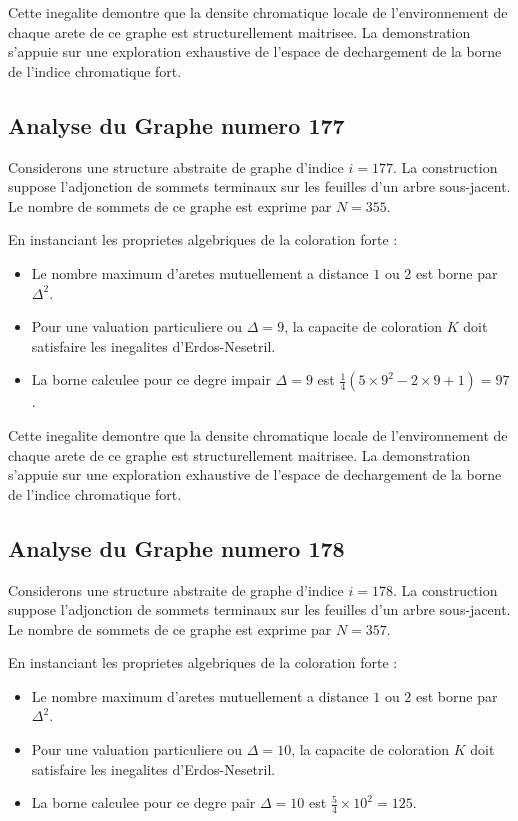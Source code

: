 \documentclass[11pt,a4paper]{article}
\begin{document}
Cette inegalite demontre que la densite chromatique locale de l'environnement de chaque arete de ce graphe est structurellement maitrisee. La demonstration s'appuie sur une exploration exhaustive de l'espace de dechargement de la borne de l'indice chromatique fort.

\subsection{Analyse du Graphe numero 177}
Considerons une structure abstraite de graphe d'indice $i = 177$. La construction suppose l'adjonction de sommets terminaux sur les feuilles d'un arbre sous-jacent. Le nombre de sommets de ce graphe est exprime par $N = 355$.

En instanciant les proprietes algebriques de la coloration forte :
\begin{itemize}
\item Le nombre maximum d'aretes mutuellement a distance $1$ ou $2$ est borne par $\Delta^2$.
\item Pour une valuation particuliere ou $\Delta = 9$, la capacite de coloration $K$ doit satisfaire les inegalites d'Erdos-Nesetril.
\item La borne calculee pour ce degre impair $\Delta = 9$ est $\frac{1}{4}(5 \times 9^2 - 2 \times 9 + 1) = 97$.
\end{itemize}

Cette inegalite demontre que la densite chromatique locale de l'environnement de chaque arete de ce graphe est structurellement maitrisee. La demonstration s'appuie sur une exploration exhaustive de l'espace de dechargement de la borne de l'indice chromatique fort.

\subsection{Analyse du Graphe numero 178}
Considerons une structure abstraite de graphe d'indice $i = 178$. La construction suppose l'adjonction de sommets terminaux sur les feuilles d'un arbre sous-jacent. Le nombre de sommets de ce graphe est exprime par $N = 357$.

En instanciant les proprietes algebriques de la coloration forte :
\begin{itemize}
\item Le nombre maximum d'aretes mutuellement a distance $1$ ou $2$ est borne par $\Delta^2$.
\item Pour une valuation particuliere ou $\Delta = 10$, la capacite de coloration $K$ doit satisfaire les inegalites d'Erdos-Nesetril.
\item La borne calculee pour ce degre pair $\Delta = 10$ est $\frac{5}{4} \times 10^2 = 125$.
\end{itemize}
\end{document}
